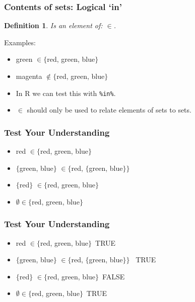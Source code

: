 \documentclass[aspectratio=169, handout]{beamer}
\newtheorem{defn}{Definition}
\numberwithin{equation}{section}
\begin{document}
\begin{frame}
\frametitle{Contents of sets: Logical `in'}

\begin{defn}
Is an element of: $\in$.
\end{defn}
\pause

{Examples: } \pause
\begin{itemize}
\item green $\in \{$red, green, blue$\}$
\item magenta $\not\in \{$red, green, blue$\}$\pause
\item In R we can test this with \texttt{\%in\%}.
\item $\in$ should only be used to relate elements of sets to sets.
\end{itemize}
   
\end{frame}



\begin{frame}
\frametitle{Test Your Understanding}

\begin{itemize}
\item red $\in \{$red, green, blue$\}$
\item $\{$green, blue$\}$ $\in \{$red, $\{$green, blue$\}\}$
\item $\{$red$\}$ $\in \{$red, green, blue$\}$
\item $\emptyset \in \{$red, green, blue$\}$
\end{itemize}
   
\end{frame}


\begin{frame}
\frametitle{Test Your Understanding}

\begin{itemize}
\item red $\in \{$red, green, blue$\}$\ TRUE
\item $\{$green, blue$\}$ $\in \{$red, $\{$green, blue$\}\}$ \ TRUE
\item $\{$red$\}$ $\in \{$red, green, blue$\}$\ FALSE
\item $\emptyset \in \{$red, green, blue$\}$\ TRUE
\end{itemize}
   
\end{frame}
\end{document}
